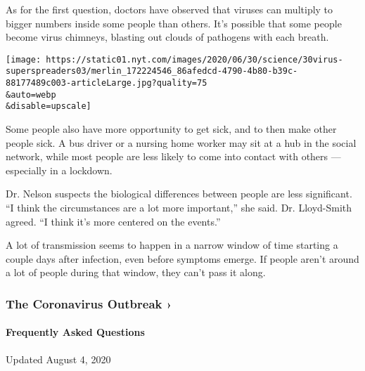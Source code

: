 As for the first question, doctors have observed that viruses can
multiply to bigger numbers inside some people than others. It's possible
that some people become virus chimneys, blasting out clouds of pathogens
with each breath.

\texttt{[image: https://static01.nyt.com/images/2020/06/30/science/30virus-superspreaders03/merlin\_172224546\_86afedcd-4790-4b80-b39c-88177489c003-articleLarge.jpg?quality=75\\\&auto=webp\\\&disable=upscale]}

Some people also have more opportunity to get sick, and to then make
other people sick. A bus driver or a nursing home worker may sit at a
hub in the social network, while most people are less likely to come
into contact with others --- especially in a lockdown.

Dr. Nelson suspects the biological differences between people are less
significant. ``I think the circumstances are a lot more important,'' she
said. Dr. Lloyd-Smith agreed. ``I think it's more centered on the
events.''

A lot of transmission seems to happen in a narrow window of time
starting a couple days after infection, even before symptoms emerge. If
people aren't around a lot of people during that window, they can't pass
it along.

\href{https://www.nytimes.com/news-event/coronavirus?action=click\&pgtype=Article\&state=default\&region=MAIN_CONTENT_3\&context=storylines_faq}{}

\hypertarget{the-coronavirus-outbreak-}{%
\subsubsection{The Coronavirus Outbreak
›}\label{the-coronavirus-outbreak-}}

\hypertarget{frequently-asked-questions}{%
\paragraph{Frequently Asked
Questions}\label{frequently-asked-questions}}

Updated August 4, 2020

